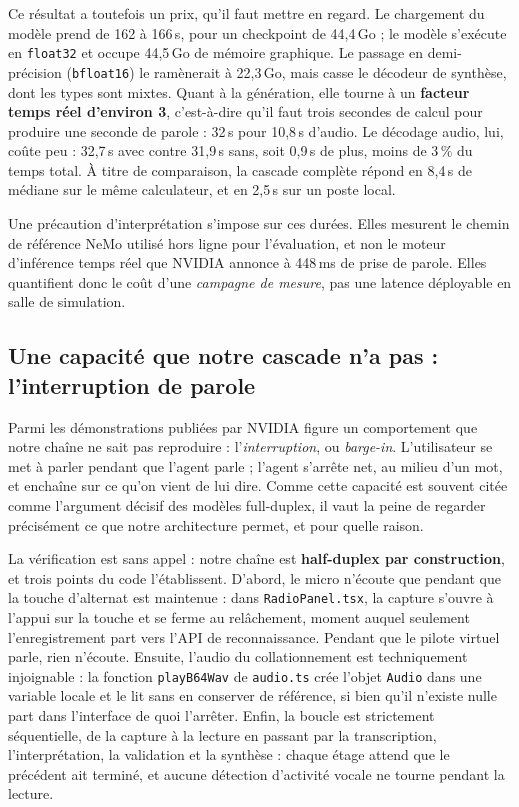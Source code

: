 \documentclass[11pt,a4paper]{article}
\begin{document}
Ce résultat a toutefois un prix, qu'il faut mettre en regard. Le chargement du
modèle prend de 162 à 166\,s, pour un checkpoint de 44,4\,Go ; le modèle
s'exécute en \texttt{float32} et occupe 44,5\,Go de mémoire graphique. Le passage
en demi-précision (\texttt{bfloat16}) le ramènerait à 22,3\,Go, mais casse le
décodeur de synthèse, dont les types sont mixtes. Quant à la génération, elle
tourne à un \textbf{facteur temps réel d'environ 3}, c'est-à-dire qu'il faut
trois secondes de calcul pour produire une seconde de parole : 32\,s pour 10,8\,s
d'audio. Le décodage audio, lui, coûte peu : 32,7\,s avec contre 31,9\,s sans,
soit 0,9\,s de plus, moins de 3\,\% du temps total. À titre de comparaison, la cascade complète répond en 8,4\,s de
médiane sur le même calculateur, et en 2,5\,s sur un poste local.

Une précaution d'interprétation s'impose sur ces durées. Elles mesurent le
chemin de référence NeMo utilisé hors ligne pour l'évaluation, et non le moteur
d'inférence temps réel que NVIDIA annonce à 448\,ms de prise de parole. Elles
quantifient donc le coût d'une \emph{campagne de mesure}, pas une latence
déployable en salle de simulation.

\subsection{Une capacité que notre cascade n'a pas : l'interruption de parole}

Parmi les démonstrations publiées par NVIDIA figure un comportement que notre
chaîne ne sait pas reproduire : l'\emph{interruption}, ou \emph{barge-in}.
L'utilisateur se met à parler pendant que l'agent parle ; l'agent s'arrête net,
au milieu d'un mot, et enchaîne sur ce qu'on vient de lui dire. Comme cette
capacité est souvent citée comme l'argument décisif des modèles full-duplex, il
vaut la peine de regarder précisément ce que notre architecture permet, et pour
quelle raison.

La vérification est sans appel : notre chaîne est \textbf{half-duplex par
construction}, et trois points du code l'établissent. D'abord, le micro
n'écoute que pendant que la touche d'alternat est maintenue : dans
\texttt{RadioPanel.tsx}, la capture s'ouvre à l'appui sur la touche et se ferme
au relâchement, moment auquel seulement l'enregistrement part vers l'API de
reconnaissance. Pendant que le pilote virtuel parle, rien n'écoute. Ensuite,
l'audio du collationnement est techniquement injoignable : la fonction
\texttt{playB64Wav} de \texttt{audio.ts} crée l'objet \texttt{Audio} dans une
variable locale et le lit sans en conserver de référence, si bien qu'il n'existe
nulle part dans l'interface de quoi l'arrêter. Enfin, la boucle est strictement
séquentielle, de la capture à la lecture en passant par la transcription,
l'interprétation, la validation et la synthèse : chaque étage attend que le
précédent ait terminé, et aucune détection d'activité vocale ne tourne pendant
la lecture.
\end{document}
